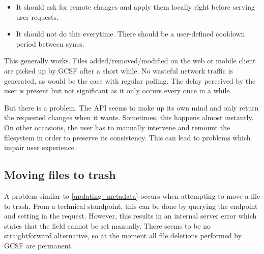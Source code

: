 \begin{itemize}
  \itemsep0em
  \item It should ask for remote changes and apply them locally right before serving user requests.
  \item It should not do this everytime. There should be a user-defined cooldown period between syncs.
\end{itemize}

This generally works. Files added/removed/modified on the web or mobile client are picked up by GCSF after a short while. No wasteful network traffic is generated, as would be the case with regular polling. The delay perceived by the user is present but not significant as it only occurs every once in a while.

But there is a problem. The API seems to make up its own mind and only return the requested changes when it wants. Sometimes, this happens almost instantly. On other occasions, the user has to manually intervene and remount the filesystem in order to preserve its consistency. This can lead to problems which impair user experience.

\subsection{Moving files to trash}

A problem similar to \ref{updating_metadata} occurs when attempting to move a file to trash. From a technical standpoint, this can be done by querying the  endpoint and setting  in the request. However, this results in an internal server error which states that the  field cannot be set manually. There seems to be no straightforward alternative, so at the moment all file deletions performed by GCSF are permanent.
